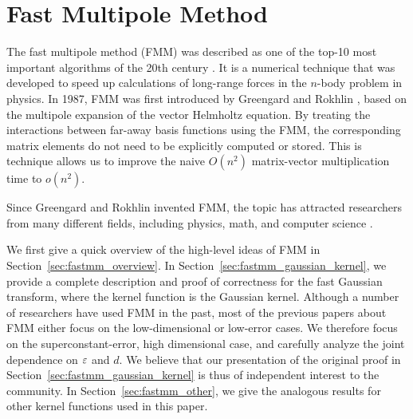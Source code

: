 
\section{Fast Multipole Method}\label{sec:fastmm}
The fast multipole method (FMM) was described as one of the top-10 most important algorithms of the 20th century \cite{dongarra2000guest}. It is a numerical technique that was developed to speed up calculations of long-range forces in the $n$-body problem in physics. In 1987, FMM was first introduced by Greengard and Rokhlin \cite{gr87}, based on the multipole expansion of the vector Helmholtz equation. By treating the interactions between far-away basis functions using the FMM, the corresponding matrix elements do not need to be explicitly computed or stored. This is technique allows us to improve the naive $O(n^2)$ matrix-vector multiplication time to $o(n^2)$.

Since Greengard and Rokhlin invented FMM, the topic has attracted researchers from many different fields, including physics, math, and computer science  \cite{gr87,g88,gr88,gr89,g90,gs91,emrv92,g94,gr96,bg97,d00,ydgd03,ydd04,m12}.

We first give a quick overview of the high-level ideas of FMM in Section~\ref{sec:fastmm_overview}. In Section~\ref{sec:fastmm_gaussian_kernel}, we provide a complete description and proof of correctness for the fast Gaussian transform, where the kernel function is the Gaussian kernel. Although a number of researchers have used FMM in the past, most of the previous papers about FMM either focus on the low-dimensional or low-error cases. We therefore focus on the superconstant-error, high dimensional case, and carefully analyze the joint dependence on $\varepsilon$ and $d$. We believe that our presentation of the original proof in Section~\ref{sec:fastmm_gaussian_kernel} is thus of independent interest to the community. In Section~\ref{sec:fastmm_other}, we give the analogous results for other kernel functions used in this paper.


